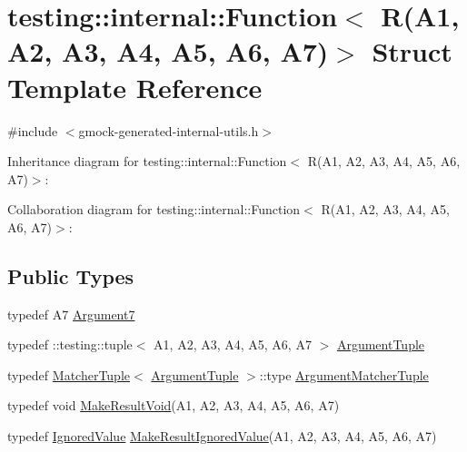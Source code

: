 \hypertarget{structtesting_1_1internal_1_1_function_3_01_r_07_a1_00_01_a2_00_01_a3_00_01_a4_00_01_a5_00_01_a6_00_01_a7_08_4}{}\section{testing\+:\+:internal\+:\+:Function$<$ R(A1, A2, A3, A4, A5, A6, A7)$>$ Struct Template Reference}
\label{structtesting_1_1internal_1_1_function_3_01_r_07_a1_00_01_a2_00_01_a3_00_01_a4_00_01_a5_00_01_a6_00_01_a7_08_4}


{\ttfamily \#include $<$gmock-\/generated-\/internal-\/utils.\+h$>$}



Inheritance diagram for testing\+:\+:internal\+:\+:Function$<$ R(A1, A2, A3, A4, A5, A6, A7)$>$\+:


Collaboration diagram for testing\+:\+:internal\+:\+:Function$<$ R(A1, A2, A3, A4, A5, A6, A7)$>$\+:
\subsection*{Public Types}
\begin{DoxyCompactItemize}
\item 
typedef A7 \hyperlink{structtesting_1_1internal_1_1_function_3_01_r_07_a1_00_01_a2_00_01_a3_00_01_a4_00_01_a5_00_01_a6_00_01_a7_08_4_a55fa91035fc3c9da4c6ab94060ca6f6f}{Argument7}
\item 
typedef \+::testing\+::tuple$<$ A1, A2, A3, A4, A5, A6, A7 $>$ \hyperlink{structtesting_1_1internal_1_1_function_3_01_r_07_a1_00_01_a2_00_01_a3_00_01_a4_00_01_a5_00_01_a6_00_01_a7_08_4_a6bbc1f28c56e599aca98ab8ae7caf9ab}{Argument\+Tuple}
\item 
typedef \hyperlink{structtesting_1_1internal_1_1_matcher_tuple}{Matcher\+Tuple}$<$ \hyperlink{structtesting_1_1internal_1_1_function_3_01_r_07_08_4_ad483c3128c470d8cdb55c3ac1c575c11}{Argument\+Tuple} $>$\+::type \hyperlink{structtesting_1_1internal_1_1_function_3_01_r_07_a1_00_01_a2_00_01_a3_00_01_a4_00_01_a5_00_01_a6_00_01_a7_08_4_a76b4296ad8b88922e997170875e9198d}{Argument\+Matcher\+Tuple}
\item 
typedef void \hyperlink{structtesting_1_1internal_1_1_function_3_01_r_07_a1_00_01_a2_00_01_a3_00_01_a4_00_01_a5_00_01_a6_00_01_a7_08_4_a9e3d04c8472e00161b080690f62f9eb4}{Make\+Result\+Void}(A1, A2, A3, A4, A5, A6, A7)
\item 
typedef \hyperlink{classtesting_1_1internal_1_1_ignored_value}{Ignored\+Value} \hyperlink{structtesting_1_1internal_1_1_function_3_01_r_07_a1_00_01_a2_00_01_a3_00_01_a4_00_01_a5_00_01_a6_00_01_a7_08_4_a12b0ade73c76ea564afa7dd2b5c219b6}{Make\+Result\+Ignored\+Value}(A1, A2, A3, A4, A5, A6, A7)
\end{DoxyCompactItemize}



